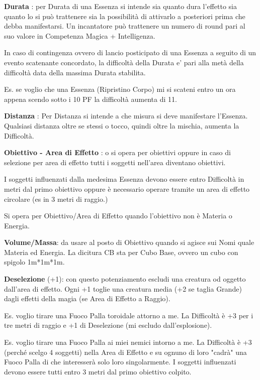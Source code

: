 \documentclass[a4paper,twoside,openany]{book}
\begin{document}
\begin{multicols}{2}

\textbf{Durata} : per Durata di una Essenza si intende sia quanto dura l'effetto sia quanto lo si può trattenere sia la possibilità di attivarlo a posteriori prima che debba manifestarsi. Un incantatore può trattenere un numero di round pari al suo valore in Competenza Magica + Intelligenza.

In caso di contingenza ovvero di lancio posticipato di una Essenza a seguito di un evento scatenante concordato, la difficoltà della Durata e' pari alla metà della difficoltà data della massima Durata stabilita.

Es. se voglio che una Essenza (Ripristino Corpo) mi si scateni entro un ora appena scendo sotto i 10 PF la difficoltà aumenta di 11.

\textbf{Distanza} : Per Distanza si intende a che misura si deve manifestare l'Essenza.
Qualsiasi distanza oltre se stessi o tocco, quindi oltre la mischia, aumenta la Difficoltà.

\textbf{Obiettivo - Area di Effetto} : o si opera per obiettivi oppure in caso di selezione per area di effetto tutti i soggetti nell'area diventano obiettivi.

I soggetti influenzati dalla medesima Essenza devono essere entro Difficoltà in metri dal primo obiettivo oppure è necessario operare tramite un area di effetto circolare (es in 3 metri di raggio.)

Si opera per Obiettivo/Area di Effetto quando l'obiettivo non è Materia o Energia.

\textbf{Volume/Massa}: da usare al posto di Obiettivo quando si agisce sui Nomi quale Materia ed Energia. La dicitura CB sta per Cubo Base, ovvero un cubo con spigolo 1m*1m*1m.

\textbf{Deselezione} (+1): con questo potenziamento escludi una creatura od oggetto dall'area di  effetto. Ogni +1 toglie una creatura media (+2 se taglia Grande) dagli effetti della magia (se Area di Effetto a Raggio).

Es. voglio tirare una Fuoco Palla toroidale attorno a me. La Difficoltà è +3 per i tre metri di raggio e +1 di Deselezione (mi escludo dall'esplosione).

Es. voglio tirare una Fuoco Palla ai miei nemici intorno a me. La Difficoltà è +3 (perché scelgo 4 soggetti) nella Area di Effetto e su ognuno di loro "cadrà" una Fuoco Palla di che interesserà solo loro singolarmente. I soggetti influenzati devono essere tutti entro 3 metri dal primo obiettivo colpito.


\end{multicols}
\end{document}
